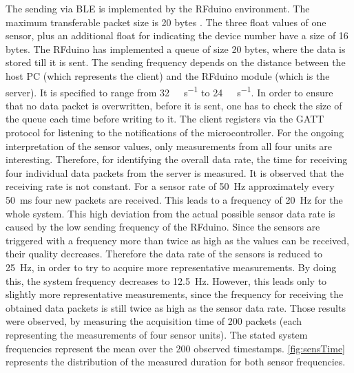 The sending via BLE is implemented by the RFduino environment. The maximum transferable packet size is 20 bytes \cite{rfduino2015data}. The three float values of one sensor, plus an additional float for indicating the device number have a size of 16 bytes. The RFduino has implemented a queue of size 20 bytes, where the data is stored till it is sent. The sending frequency depends on the distance between the host PC (which represents the client) and the RFduino module (which is the server). It is specified to range from \SI[per-mode=symbol]{32}{\kilo \bit \per \second} to \SI[per-mode=symbol]{24}{\kilo \bit \per \second}. In order to ensure that no data packet is overwritten, before it is sent, one has to check the size of the queue each time before writing to it. The client registers via the \ac{GATT} protocol for listening to the notifications of the microcontroller. For the ongoing interpretation of the sensor values, only measurements from all four units are interesting. Therefore, for identifying the overall data rate, the time for receiving four individual data packets from the server is measured. It is observed that the receiving rate is not constant. For a sensor rate of \SI{50}{\Hz} approximately every \SI{50}{\ms} four new packets are received. This leads to a frequency of \SI{20}{\Hz} for the whole system. This high deviation from the actual possible sensor data rate is caused by the low sending frequency of the RFduino. Since the sensors are triggered with a frequency more than twice as high as the values can be received, their quality decreases. Therefore the data rate of the sensors is reduced to \SI{25}{\Hz}, in order to try to acquire more representative measurements. By doing this, the system frequency decreases to \SI{12.5}{\Hz}. However, this leads only to slightly more representative measurements, since the frequency for receiving the obtained data packets is still twice as high as the sensor data rate. Those results were observed, by measuring the acquisition time of 200 packets (each representing the measurements of four sensor units). The stated system frequencies represent the mean over the 200 observed timestamps. \ref{fig:sensTime} represents the distribution of the measured duration for both sensor frequencies.
